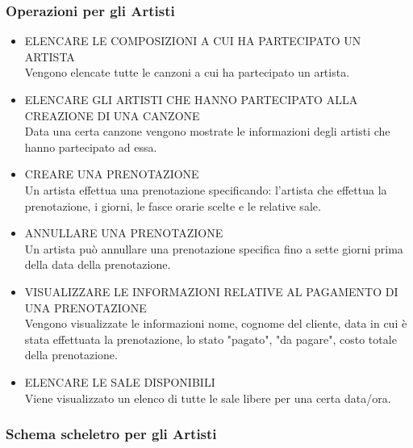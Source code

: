\documentclass{article}
\newcounter{counteroperazioni}
\newcommand{\coperazioni}{\addtocounter{counteroperazioni}{1}\thecounteroperazioni}
\begin{document}
\subsubsection{Operazioni per gli Artisti}
\setcounter{counteroperazioni}{0}
\begin{itemize}[labelindent=1.5em,labelsep=.5cm,leftmargin=*]
    \item [\textbf{A\coperazioni)}] ELENCARE LE COMPOSIZIONI A CUI HA PARTECIPATO UN ARTISTA \\ Vengono elencate tutte le canzoni a cui ha partecipato un artista.
    \item [\textbf{A\coperazioni)}] ELENCARE GLI ARTISTI CHE HANNO PARTECIPATO ALLA CREAZIONE DI UNA CANZONE \\ Data una certa canzone vengono mostrate le informazioni degli artisti che hanno partecipato ad essa.

    \item [\textbf{A\coperazioni)}] CREARE UNA PRENOTAZIONE \\ Un artista effettua una prenotazione specificando: l'artista che effettua la prenotazione, i giorni, le fasce orarie scelte e le relative sale. 
    \item [\textbf{A\coperazioni)}] ANNULLARE UNA PRENOTAZIONE \\ Un artista può annullare una prenotazione specifica fino a sette giorni prima della data della prenotazione.
    \item [\textbf{A\coperazioni)}] VISUALIZZARE LE INFORMAZIONI RELATIVE AL PAGAMENTO DI UNA PRENOTAZIONE \\ Vengono visualizzate le informazioni nome, cognome del cliente, data in cui è stata effettuata la prenotazione, lo stato "pagato", "da pagare", costo totale della prenotazione. 
    \item [\textbf{A\coperazioni)}] ELENCARE LE SALE DISPONIBILI \\ Viene visualizzato un elenco di tutte le sale libere per una certa data/ora.
\end{itemize}



\subsubsection{Schema scheletro per gli Artisti}
\begin{center}
    
\end{center}
\end{document}
